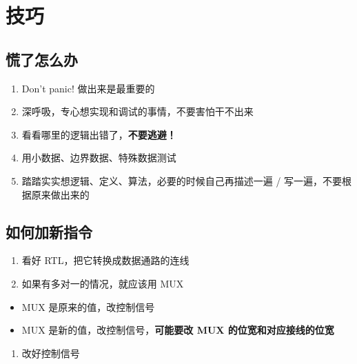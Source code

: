\documentclass[12pt,AutoFakeBold,AutoFakeSlant]{article}
\providecommand{\tightlist}{%
  \setlength{\itemsep}{0pt}\setlength{\parskip}{0pt}}
\begin{document}
\hypertarget{ux6280ux5de7}{%
\section{技巧}\label{ux6280ux5de7}}

\hypertarget{ux614cux4e86ux600eux4e48ux529e}{%
\subsection{慌了怎么办}\label{ux614cux4e86ux600eux4e48ux529e}}

\begin{enumerate}
\def\labelenumi{\arabic{enumi}.}
\tightlist
\item
  Don't panic! 做出来是最重要的
\item
  深呼吸，专心想实现和调试的事情，不要害怕干不出来
\item
  看看哪里的逻辑出错了，\textbf{不要逃避！}
\item
  用小数据、边界数据、特殊数据测试
\item
  踏踏实实想逻辑、定义、算法，必要的时候自己再描述一遍 /
  写一遍，不要根据原来做出来的
\end{enumerate}

\hypertarget{ux5982ux4f55ux52a0ux65b0ux6307ux4ee4}{%
\subsection{如何加新指令}\label{ux5982ux4f55ux52a0ux65b0ux6307ux4ee4}}

\begin{enumerate}
\def\labelenumi{\arabic{enumi}.}
\tightlist
\item
  看好 RTL，把它转换成数据通路的连线
\item
  如果有多对一的情况，就应该用 MUX
\end{enumerate}

\begin{itemize}
\tightlist
\item
  MUX 是原来的值，改控制信号
\item
  MUX 是新的值，改控制信号，\textbf{可能要改 MUX 的位宽和对应接线的位宽}
\end{itemize}

\begin{enumerate}
\def\labelenumi{\arabic{enumi}.}
\setcounter{enumi}{2}
\tightlist
\item
  改好控制信号
\end{enumerate}
\end{document}
